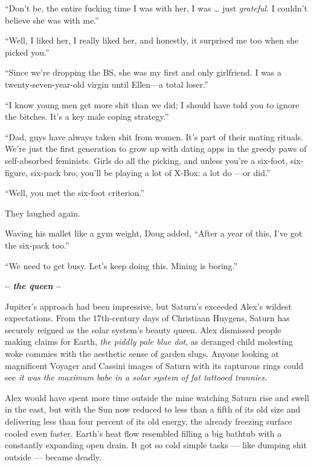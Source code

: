 ``Don't be, the entire fucking time I was with her, I was \ldots{} just
\emph{grateful}. I couldn't believe she was with me.''

``Well, I liked her, I really liked her, and honestly, it surprised me
too when she picked you.''

``Since we're dropping the BS, she was my first and only girlfriend. I
was a twenty-seven-year-old virgin until Ellen---a total loser.''

``I know young men get more shit than we did; I should have told you to
ignore the bitches. It's a key male coping strategy.''

``Dad, guys have always taken shit from women. It's part of their mating
rituals. We're just the first generation to grow up with dating apps in
the greedy paws of self-absorbed feminists. Girls do all the picking,
and unless you're a six-foot, six-figure, six-pack bro, you'll be
playing a lot of X-Box: a lot do ---or did.''

``Well, you met the six-foot criterion.''

They laughed again.

Waving his mallet like a gym weight, Doug added, ``After a year of this,
I've got the six-pack too.''

``We need to get busy. Let's keep doing this. Mining is boring.''

\begin{center}\large\textbf{-- \emph{the queen} --}\normalsize\end{center}

Jupiter's approach had been impressive, but Saturn's exceeded Alex's
wildest expectations. From the 17th-century days of Christiaan Huygens,
Saturn has securely reigned as the solar system's beauty queen. Alex
dismissed people making claims for Earth, \emph{the piddly pale blue
dot}, as deranged child molesting woke commies with the aesthetic sense
of garden slugs. Anyone looking at magnificent Voyager and Cassini
images of Saturn with its rapturous rings could see \emph{it was the
maximum babe in a solar system of fat tattooed trannies.}

Alex would have spent more time outside the mine watching Saturn rise
and swell in the east, but with the Sun now reduced to less than a fifth
of its old size and delivering less than four percent of its old energy,
the already freezing surface cooled even faster. Earth's heat flow
resembled filling a big bathtub with a constantly expanding open drain.
It got so cold simple tasks --- like dumping shit outside --- became
deadly.

